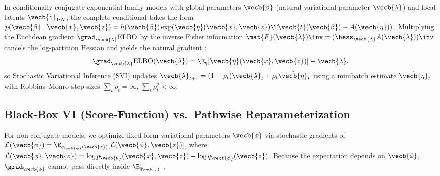 \documentclass[../../../../master.tex]{subfiles}
\begin{document}
In conditionally conjugate exponential-family models with global parameters $\vecb{\beta}$ (natural variational parameter $\vecb{\lambda}$) and local latents $\vecb{z}_{1:N}$, the complete conditional takes the form
$p(\vecb{\beta} \mid \vecb{x}, \vecb{z}) = h(\vecb{\beta})\exp(\vecb{\eta}(\vecb{x}, \vecb{z})\T \vecb{t}(\vecb{\beta}) - A(\vecb{\eta}))$.
Multiplying the Euclidean gradient $\grad_{\vecb{\lambda}}\mathrm{ELBO}$ by the inverse Fisher information $\mat{F}(\vecb{\lambda})\inv = (\hess_{\vecb{\lambda}} A(\vecb{\lambda}))\inv$ cancels the log-partition Hessian and yields the natural gradient :
\begin{equation}
  \tilde{\grad}_{\vecb{\lambda}} \mathrm{ELBO}(\vecb{\lambda}) = \E_q[\vecb{\eta}(\vecb{x}, \vecb{z})] - \vecb{\lambda},
  \label{eq:vi:natgrad}
\end{equation}
so Stochastic Variational Inference (SVI) updates $\vecb{\lambda}_{t+1} = (1 - \rho_t)\vecb{\lambda}_t + \rho_t \hat{\vecb{\eta}}_t$ using a minibatch estimate $\hat{\vecb{\eta}}_t$ with Robbins--Monro step sizes $\sum_t \rho_t = \infty$, $\sum_t \rho_t^2 < \infty$.

\subsection{Black-Box VI (Score-Function) vs.\ Pathwise Reparameterization}

For non-conjugate models, we optimize fixed-form variational parameters $\vecb{\phi}$ via stochastic gradients of $\mathcal{L}(\vecb{\phi}) = \E_{q_{\vecb{\phi}}(\vecb{z})}[\tilde{\mathcal{L}}(\vecb{\phi}, \vecb{z})]$, where $\tilde{\mathcal{L}}(\vecb{\phi}, \vecb{z}) = \log p_{\vecb{\theta}}(\vecb{x}, \vecb{z}) - \log q_{\vecb{\phi}}(\vecb{z})$. Because the expectation depends on $\vecb{\phi}$, $\grad_{\vecb{\phi}}$ cannot pass directly inside $\E_{q_{\vecb{\phi}}}$ .
\end{document}
